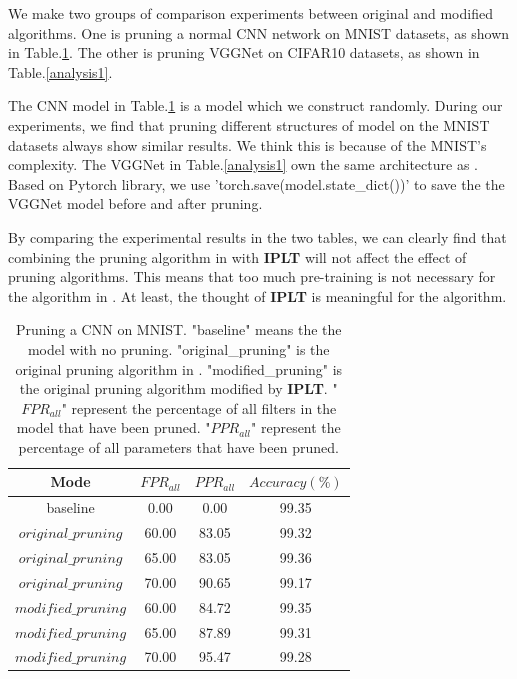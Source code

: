 \documentclass[runningheads]{llncs}
\begin{document}
We make two groups of comparison experiments between original and modified algorithms. One is pruning a normal CNN network on MNIST datasets, as shown in Table.\ref{mnist}. The other is pruning VGGNet on CIFAR10 datasets, as shown in Table.\ref{analysis1}.

The CNN model in Table.\ref{mnist} is a model which we construct randomly. During our experiments, we find that pruning different structures of model on the MNIST datasets always show similar results. We think this is because of the MNIST's complexity. The VGGNet in Table.\ref{analysis1} own the same architecture as \cite{b35}. Based on Pytorch library, we use 'torch.save(model.state\_dict())' to save the the VGGNet model before and after pruning.

By comparing the experimental results in the two tables, we can clearly find that combining the pruning algorithm in \cite{b35} with \textbf{IPLT} will not affect the effect of pruning algorithms. This means that too much pre-training is not necessary for the algorithm in \cite{b35}. At least, the thought of \textbf{IPLT} is meaningful for the algorithm.


\begin{table}[!htbp]{\centering}
\caption{Pruning a CNN on MNIST. "baseline" means the the model with no pruning. "original\_pruning" is the original pruning algorithm in \cite{b35}. "modified\_pruning" is the original pruning algorithm modified by \textbf{IPLT}. "$FPR_{all}$" represent the percentage of all filters in the model that have been pruned. "$PPR_{all}$" represent the percentage of all parameters that have been pruned.}
\begin{center}
\begin{tabular}{|c|c|c|c|}
\hline
{Mode} & {$FPR_{all}$} & $PPR_{all}$ & $Accuracy(\%)$ \\ \hline
baseline & 0.00 & 0.00 & 99.35 \\ \hline
$original\_pruning$ & 60.00 & 83.05 & 99.32 \\
$original\_pruning$  & 65.00 & 83.05 & 99.36 \\
$original\_pruning$  & 70.00 & 90.65 & 99.17 \\ \hline
$modified\_pruning$  & 60.00 & 84.72 & 99.35\\
$modified\_pruning$ & 65.00 & 87.89 & 99.31\\
$modified\_pruning$ & 70.00 & 95.47 & 99.28\\ \hline
\end{tabular}
\end{center}
\label{mnist}
\end{table}
\end{document}
